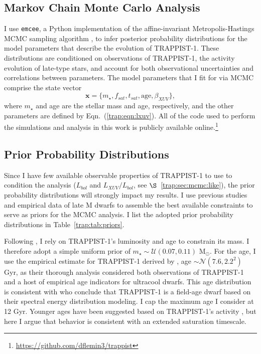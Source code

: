 
\subsection{Markov Chain Monte Carlo Analysis} \label{trap:sec:mcmc}

I use \texttt{emcee}, a Python implementation of the affine-invariant Metropolis-Hastings MCMC sampling algorithm \citep{ForemanMackey2013}, to infer posterior probability distributions for the model parameters that describe the evolution of TRAPPIST-1. These distributions are conditioned on observations of TRAPPIST-1, the activity evolution of late-type stars, and account for both observational uncertainties and correlations between parameters. The model parameters that I fit for via MCMC comprise the state vector
\begin{equation} \label{trap:eqn:state}
    \textbf{x} = \{m_{\star}, f_{sat}, t_{sat}, \mathrm{age}, \beta_{XUV}\},
\end{equation}
where $m_{\star}$ and age are the stellar mass and age, respectively, and the other parameters are defined by Eqn.~(\ref{trap:eqn:lxuv}). All of the code used to perform the simulations and analysis in this work is publicly available online.\footnote{ \href{https://github.com/dflemin3/trappist}{https://github.com/dflemin3/trappist}}

\subsection{Prior Probability Distributions} \label{trap:sec:mcmc:priors}

Since I have few available observable properties of TRAPPIST-1 to use to condition the analysis ($L_{bol}$ and $L_{XUV}/L_{bol}$, see $\S$~\ref{trap:sec:mcmc:like}), the prior probability distributions will strongly impact my results. I use previous studies and empirical data of late M dwarfs to assemble the best available constraints to serve as priors for the MCMC analysis. I list the adopted prior probability distributions in Table~\ref{trap:tab:priors}.

Following \citet{vanGrootel2018}, I rely on TRAPPIST-1's luminosity and age to constrain its mass. I therefore adopt a simple uniform prior of $m_{\star} \sim \mathcal{U}(0.07, 0.11)$ M$_{\odot}$. For the age, I use the empirical estimate for TRAPPIST-1 derived by \citet{Burgasser2017}, age $\sim \mathcal{N}(7.6, 2.2^2)$ Gyr, as their thorough analysis considered both observations of TRAPPIST-1 and a host of empirical age indicators for ultracool dwarfs. This age distribution is consistent with \citet{Gonzales2019} who conclude that TRAPPIST-1 is a field-age dwarf based on their spectral energy distribution modeling. I cap the maximum age I consider at 12 Gyr. Younger ages have been suggested based on TRAPPIST-1's activity \citep[e.g.~$\gsim 500$ Myr,][]{Bourrier2017b}, but here I argue that behavior is consistent with an extended saturation timescale.

